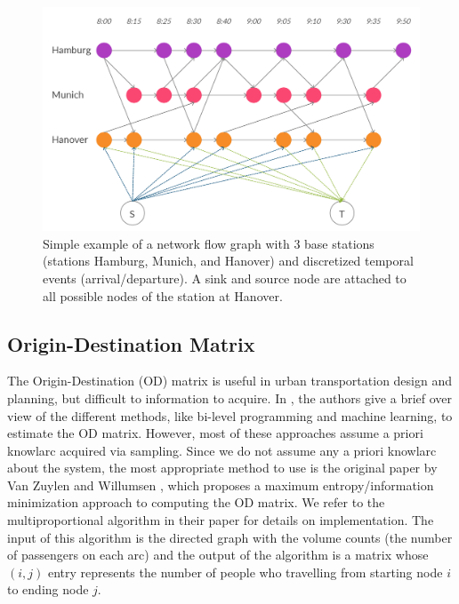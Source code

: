\documentclass[11pt]{article}
\begin{document}
\begin{figure}
    \centering
    \includegraphics[scale=0.15]{pics/Graph.jpg}
    \caption{Simple example of a network flow graph with 3 base stations (stations Hamburg, Munich, and Hanover) and discretized temporal events (arrival/departure). A sink and source node are attached to all possible nodes of the station at Hanover.}
    \label{fig:graph}
\end{figure}
\subsection{Origin-Destination Matrix}
\par The Origin-Destination (OD) matrix is useful in urban transportation design and planning, but difficult to information to acquire. In \cite{bera_krishna_rao}, the authors give a brief over view of the different methods, like bi-level programming and machine learning, to estimate the OD matrix. However, most of these approaches assume a priori knowlarc acquired via sampling. Since we do not assume any a priori knowlarc about the system, the most appropriate method to use is the original paper by Van Zuylen and Willumsen \cite{van_zuylen_willumsen_1978}, which proposes a maximum entropy/information minimization  approach to computing the OD matrix. We refer to the multiproportional algorithm in their paper for details on implementation. The input of this algorithm is the directed graph with the volume counts (the number of passengers on each arc) and the output of the algorithm is a matrix whose $(i,j)$ entry represents the number of people who travelling from starting node $i$ to ending node $j$.
\end{document}
